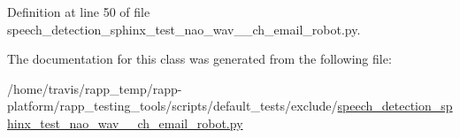 Definition at line 50 of file speech\-\_\-detection\-\_\-sphinx\-\_\-test\-\_\-nao\-\_\-wav\-\_\-\_\-ch\-\_\-email\-\_\-robot.\-py.



The documentation for this class was generated from the following file\-:\begin{DoxyCompactItemize}
\item 
/home/travis/rapp\-\_\-temp/rapp-\/platform/rapp\-\_\-testing\-\_\-tools/scripts/default\-\_\-tests/exclude/\hyperlink{speech__detection__sphinx__test__nao__wav__1__ch__email__robot_8py}{speech\-\_\-detection\-\_\-sphinx\-\_\-test\-\_\-nao\-\_\-wav\-\_\-\_\-ch\-\_\-email\-\_\-robot.\-py}\end{DoxyCompactItemize}

